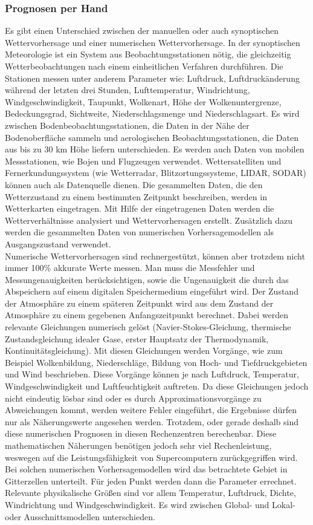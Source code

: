 \subsubsection{Prognosen per Hand} %
Es gibt einen Unterschied zwischen der manuellen oder auch
synoptischen Wettervorhersage und einer numerischen Wettervorhersage.
In der synoptischen Meteorologie ist ein System aus Beobachtungsstationen
nötig, die gleichzeitig Wetterbeobachtungen nach einem einheitlichen Verfahren durchführen.
Die Stationen messen unter anderem Parameter wie:
Luftdruck, Luftdruckänderung während der letzten drei Stunden,
Lufttemperatur, Windrichtung, Windgeschwindigkeit, Taupunkt,
Wolkenart, Höhe der Wolkenuntergrenze, Bedeckungsgrad,
Sichtweite, Niederschlagsmenge und Niederschlagsart.
Es wird zwischen Bodenbeobachtungsstationen, die Daten in der Nähe
der Bodenoberfläche sammeln und aerologischen Beobachtungsstationen,
die Daten aus bis zu 30 km Höhe liefern unterschieden.
Es werden auch Daten von mobilen Messstationen, wie Bojen und Flugzeugen verwendet.
Wettersatelliten und Fernerkundungssystem
(wie Wetterradar, Blitzortungssysteme, LIDAR, SODAR) können auch als Datenquelle dienen.
Die gesammelten Daten, die den Wetterzustand zu einem bestimmten
Zeitpunkt beschreiben, werden in Wetterkarten eingetragen.
Mit Hilfe der eingetragenen Daten werden die Wetterverhältnisse
analysiert und Wettervorhersagen erstellt.
Zusätzlich dazu werden die gesammelten Daten von numerischen
Vorhersagemodellen als Ausgangszustand verwendet. \cite{noaa}
\\
Numerische Wettervorhersagen sind rechnergestützt, können aber trotzdem nicht
immer 100\% akkurate Werte messen.
Man muss die Messfehler und Messungenauigkeiten berücksichtigen, sowie die
Ungenauigkeit die durch das Abspeichern auf einem digitalen Speichermedium
eingeführt wird. \cite{floatungenau}
Der Zustand der Atmosphäre zu einem späteren Zeitpunkt wird aus dem Zustand
der Atmosphäre zu einem gegebenen Anfangszeitpunkt berechnet.
Dabei werden relevante Gleichungen numerisch gelöst
(Navier-Stokes-Gleichung, thermische Zustandsgleichung idealer Gase,
erster Hauptsatz der Thermodynamik, Kontinuitätsgleichung).
Mit diesen Gleichungen werden Vorgänge, wie zum Beispiel Wolkenbildung,
Niederschläge, Bildung von Hoch- und Tiefdruckgebieten und Wind beschrieben.
Diese Vorgänge können je nach Luftdruck, Temperatur, Windgeschwindigkeit
und Luftfeuchtigkeit auftreten.
Da diese Gleichungen jedoch nicht eindeutig lösbar sind oder es
durch Approximationsvorgänge zu Abweichungen kommt, werden weitere Fehler eingeführt,
die Ergebnisse dürfen nur als Näherungswerte angesehen werden.
Trotzdem, oder gerade deshalb sind diese numerischen Prognosen in diesen Rechenzentren berechenbar.
Diese mathematischen Näherungen benötigen jedoch sehr viel Rechenleistung,
weswegen auf die Leistungsfähigkeit von Supercomputern zurückgegriffen wird.
Bei solchen numerischen Vorhersagemodellen wird das betrachtete Gebiet in Gitterzellen unterteilt.
Für jeden Punkt werden dann die Parameter errechnet.
Relevante physikalische Größen sind vor allem Temperatur,
Luftdruck, Dichte, Windrichtung und Windgeschwindigkeit.
Es wird zwischen Global- und Lokal- oder Ausschnittsmodellen unterschieden.

